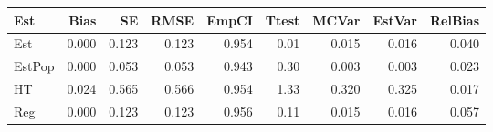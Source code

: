 
\begin{tabular}{lrrrrrrrr}
\toprule
Est & Bias & SE & RMSE & EmpCI & Ttest & MCVar & EstVar & RelBias\\
\midrule
Est & 0.000 & 0.123 & 0.123 & 0.954 & 0.01 & 0.015 & 0.016 & 0.040\\
EstPop & 0.000 & 0.053 & 0.053 & 0.943 & 0.30 & 0.003 & 0.003 & 0.023\\
HT & 0.024 & 0.565 & 0.566 & 0.954 & 1.33 & 0.320 & 0.325 & 0.017\\
Reg & 0.000 & 0.123 & 0.123 & 0.956 & 0.11 & 0.015 & 0.016 & 0.057\\
\bottomrule
\end{tabular}
